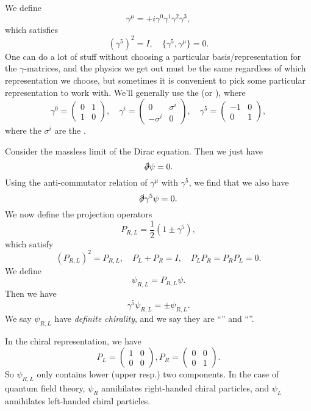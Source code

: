 \documentclass[a4paper]{article}
\begin{document}
We define
\[
  \gamma^\mu = +i \gamma^0 \gamma^1 \gamma^2 \gamma^3,
\]
which satisfies
\[
  (\gamma^5)^2 = I,\quad \{\gamma^5, \gamma^\mu\} = 0.
\]
One can do a lot of stuff without choosing a particular basis/representation for the $\gamma$-matrices, and the physics we get out must be the same regardless of which representation we choose, but sometimes it is convenient to pick some particular representation to work with. We'll generally use the  (or ), where
\[
  \gamma^0 =
  \begin{pmatrix}
    0 & 1 \\
    1 & 0
  \end{pmatrix}, \quad
  \gamma^i =
  \begin{pmatrix}
    0 & \sigma^i\\
    -\sigma^i & 0
  \end{pmatrix},\quad
  \gamma^5 =
  \begin{pmatrix}
    -1 & 0\\
    0 & 1
  \end{pmatrix},
\]
where the $\sigma^i$ are the .

Consider the massless limit of the Dirac equation. Then we just have
\[
  \slashed{\partial} \psi = 0.
\]
Using the anti-commutator relation of $\gamma^\mu$ with $\gamma^5$, we find that we also have
\[
  \slashed{\partial} \gamma^5 \psi = 0.
\]
We now define the projection operators
\[
  P_{R, L} = \frac{1}{2} (1 \pm \gamma^5),
\]
which satisfy
\[
  (P_{R, L})^2 = P_{R, L},\quad P_L + P_R = I,\quad P_L P_R = P_R P_L = 0.
\]
We define
\[
  \psi_{R, L} = P_{R, L} \psi.
\]
Then we have
\[
  \gamma^5 \psi_{R, L} = \pm \psi_{R, L}.
\]
We say $\psi_{R, L}$ have \emph{definite chirality}, and we say they are ``'' and ``''.

In the chiral representation, we have
\[
  P_L =
  \begin{pmatrix}
    1 & 0\\
    0 & 0
  \end{pmatrix},
  P_R =
  \begin{pmatrix}
    0 & 0\\
    0 & 1
  \end{pmatrix}.
\]
So $\psi_{R, L}$ only contains lower (upper resp.) two components. In the case of quantum field theory, $\psi_R$ annihilates right-handed chiral particles, and $\psi_L$ annihilates left-handed chiral particles.
\end{document}
